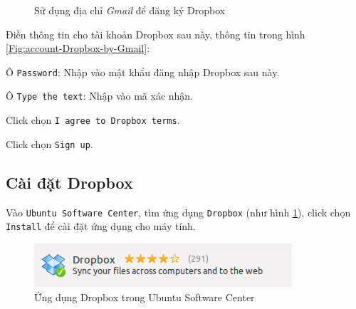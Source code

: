 \begin{list}{--}{}
\begin{figure}[!h]
\begin{center}
\end{center}
\caption{Sử dụng địa chỉ \textsl{Gmail} để đăng ký \textsf{Dropbox}}
\end{figure}
\item Điền thông tin cho tài khoản Dropbox sau này, thông tin trong hình \ref{Fig:account-Dropbox-by-Gmail}:
\begin{list}{+}{}
\item Ô \verb|Password|: Nhập vào mật khẩu đăng nhập Dropbox sau này.
\item Ô \verb|Type the text|: Nhập vào mã xác nhận.
\item Click chọn \verb|I agree to Dropbox terms|.
\item Click chọn \verb|Sign up|.
\end{list}
\end{list}
\subsection{Cài đặt Dropbox}
Vào \verb|Ubuntu Software Center|, tìm ứng dụng \verb|Dropbox| (như hình \ref{Fig:Install-Dropbox}), click chọn \verb|Install| để cài đặt ứng dụng cho máy tính.
\begin{figure}[!h]
\begin{center}
\includegraphics[scale=.7]{images/Install-Dropbox.png} 
\end{center}
\caption{Ứng dụng \textsf{Dropbox} trong \textsf{Ubuntu Software Center}}\label{Fig:Install-Dropbox}
\end{figure}
